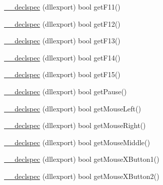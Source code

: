 \begin{DoxyCompactItemize}
\item 
\hyperlink{class_update_data_ad6d9d2c6bfcd044a1ea528913159e568}{\-\_\-\-\_\-declspec} (dllexport) bool get\-F11()
\item 
\hyperlink{class_update_data_ae617ed9a2bb84550c23f95aa689661eb}{\-\_\-\-\_\-declspec} (dllexport) bool get\-F12()
\item 
\hyperlink{class_update_data_a70be23549a5bfd7e68abdf4ed3e7dfc4}{\-\_\-\-\_\-declspec} (dllexport) bool get\-F13()
\item 
\hyperlink{class_update_data_a854d113d90688718a54dc2e48fa57c1b}{\-\_\-\-\_\-declspec} (dllexport) bool get\-F14()
\item 
\hyperlink{class_update_data_a3bcf95b713cd5bf721a537fa59667f1e}{\-\_\-\-\_\-declspec} (dllexport) bool get\-F15()
\item 
\hyperlink{class_update_data_a83f8162fdbd7b4d643e38d1a396931a6}{\-\_\-\-\_\-declspec} (dllexport) bool get\-Pause()
\item 
\hyperlink{class_update_data_aae97ade4a2312c5e7b077a9dd5b049ef}{\-\_\-\-\_\-declspec} (dllexport) bool get\-Mouse\-Left()
\item 
\hyperlink{class_update_data_acb8f51003d54a42315842060972bb112}{\-\_\-\-\_\-declspec} (dllexport) bool get\-Mouse\-Right()
\item 
\hyperlink{class_update_data_a75a659172273b80a6ec167aa887f347d}{\-\_\-\-\_\-declspec} (dllexport) bool get\-Mouse\-Middle()
\item 
\hyperlink{class_update_data_af44e4b3ed666ea882159b10270ddb133}{\-\_\-\-\_\-declspec} (dllexport) bool get\-Mouse\-X\-Button1()
\item 
\hyperlink{class_update_data_abeda968c9ccad9b16d70e47a6c3e2f06}{\-\_\-\-\_\-declspec} (dllexport) bool get\-Mouse\-X\-Button2()
\end{DoxyCompactItemize}
